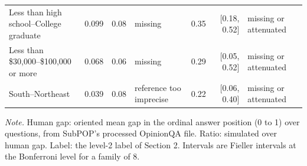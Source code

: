 \begin{table}[!ht]
{\begin{tabular}{@{}lrrlrrl@{}}
Less than high school--College graduate & 0.099 & 0.08 & missing & 0.35 & [0.18, 0.52] & missing or attenuated \\
Less than \$30,000--\$100,000 or more & 0.068 & 0.06 & missing & 0.29 & [0.05, 0.52] & missing or attenuated \\
South--Northeast & 0.039 & 0.08 & reference too imprecise & 0.22 & [0.06, 0.40] & missing or attenuated \\
\bottomrule
\end{tabular}}
\vspace{4pt}
\begin{tabnote}
\textit{Note.} Human gap: oriented mean gap in the ordinal answer position (0 to 1) over questions, from SubPOP's processed OpinionQA file. Ratio: simulated over human gap. Label: the level-2 label of Section 2. Intervals are Fieller intervals at the Bonferroni level for a family of 8.
\end{tabnote}
\end{table}
